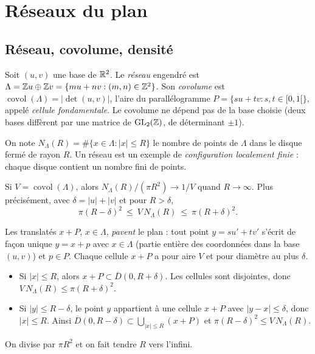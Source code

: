 \section{Réseaux du plan}
\label{ch1:sec:reseaux}

\subsection{Réseau, covolume, densité}

\begin{definition}\label{ch1:def:reseau}
Soit $(u,v)$ une base de $\mathbb{R}^2$. Le \emph{réseau} engendré est $\Lambda=\mathbb{Z} u\oplus\mathbb{Z} v=\{mu+nv : (m,n)\in\mathbb{Z}^2\}$.
Son \emph{covolume} est $\operatorname{covol}(\Lambda)=|\det(u,v)|$, l'aire du parallélogramme
$P=\{su+tv : s,t\in[0,1[\}$, appelé \emph{cellule fondamentale}. Le covolume ne dépend pas de la base choisie
(deux bases diffèrent par une matrice de $\mathrm{GL}_2(\mathbb{Z})$, de déterminant $\pm1$).
\end{definition}

On note $N_\Lambda(R)=\#\{x\in\Lambda : |x|\le R\}$ le nombre de points de $\Lambda$ dans le disque fermé de rayon $R$.
Un réseau est un exemple de \emph{configuration localement finie} : chaque disque contient un nombre fini de points.

\begin{proposition}\label{ch1:prop:comptage}
Si $V=\operatorname{covol}(\Lambda)$, alors $N_\Lambda(R)/(\pi R^2)\to 1/V$ quand $R\to\infty$. Plus précisément, avec
$\delta=|u|+|v|$ et pour $R>\delta$,
\[
  \pi (R-\delta)^2\ \le\ V\,N_\Lambda(R)\ \le\ \pi (R+\delta)^2 .
\]
\tierC{}
\end{proposition}

\begin{humanproof}
Les translatés $x+P$, $x\in\Lambda$, \emph{pavent} le plan : tout point $y=su'+tv'$ s'écrit de façon unique
$y=x+p$ avec $x\in\Lambda$ (partie entière des coordonnées dans la base $(u,v)$) et $p\in P$. Chaque cellule
$x+P$ a pour aire $V$ et pour diamètre au plus $\delta$.
\begin{itemize}
\item Si $|x|\le R$, alors $x+P\subset \overline{D}(0,R+\delta)$. Les cellules sont disjointes, donc
$V\,N_\Lambda(R)\le \pi(R+\delta)^2$.
\item Si $|y|\le R-\delta$, le point $y$ appartient à une cellule $x+P$ avec $|y-x|\le\delta$, donc $|x|\le R$.
Ainsi $\overline{D}(0,R-\delta)\subset\bigcup_{|x|\le R}(x+P)$ et $\pi(R-\delta)^2\le V\,N_\Lambda(R)$.
\end{itemize}
On divise par $\pi R^2$ et on fait tendre $R$ vers l'infini.
\end{humanproof}

